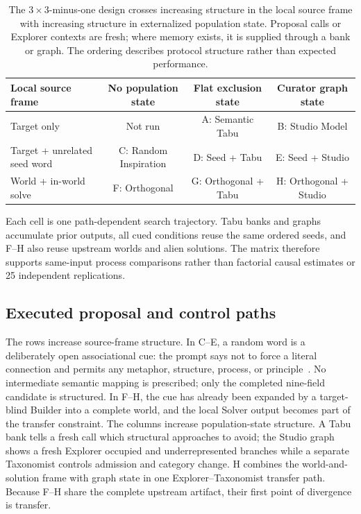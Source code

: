 \documentclass[11pt,a4paper]{article}
\begin{document}
\begin{table}[htbp]
\centering
\small
\begin{tabular}{lccc}
\toprule
\textbf{Local source frame} & \textbf{No population state} & \textbf{Flat exclusion state} & \textbf{Curator graph state} \\
\midrule
Target only & Not run & A: Semantic Tabu & B: Studio Model \\
Target + unrelated seed word & C: Random Inspiration & D: Seed + Tabu & E: Seed + Studio \\
World + in-world solve & F: Orthogonal & G: Orthogonal + Tabu & H: Orthogonal + Studio \\
\bottomrule
\end{tabular}
\caption{The $3\times3$-minus-one design crosses increasing structure in the local source frame with increasing structure in externalized population state. Proposal calls or Explorer contexts are fresh; where memory exists, it is supplied through a bank or graph. The ordering describes protocol structure rather than expected performance.}
\label{tab:design}
\end{table}

Each cell is one path-dependent search trajectory. Tabu banks and graphs accumulate prior outputs, all cued conditions reuse the same ordered seeds, and F--H also reuse upstream worlds and alien solutions. The matrix therefore supports same-input process comparisons rather than factorial causal estimates or 25 independent replications.

\subsection{Executed proposal and control paths}
\label{sec:executed}

The rows increase source-frame structure. In C--E, a random word is a deliberately open associational cue: the prompt says not to force a literal connection and permits any metaphor, structure, process, or principle~\cite{debono1970}. No intermediate semantic mapping is prescribed; only the completed nine-field candidate is structured. In F--H, the cue has already been expanded by a target-blind Builder into a complete world, and the local Solver output becomes part of the transfer constraint. The columns increase population-state structure. A Tabu bank tells a fresh call which structural approaches to avoid; the Studio graph shows a fresh Explorer occupied and underrepresented branches while a separate Taxonomist controls admission and category change. H combines the world-and-solution frame with graph state in one Explorer--Taxonomist transfer path. Because F--H share the complete upstream artifact, their first point of divergence is transfer.
\end{document}

